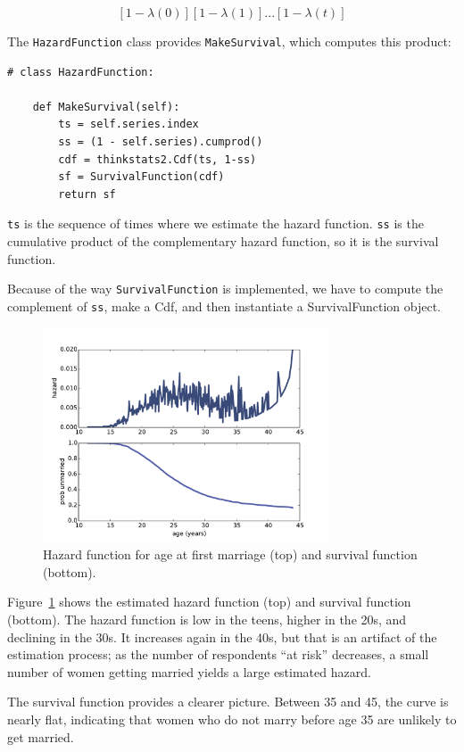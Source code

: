 \documentclass[12pt]{book}
\begin{document}
\[ [1-\lambda(0)] [1-\lambda(1)] ... [1-\lambda(t)] \]

The {\tt HazardFunction} class provides {\tt MakeSurvival}, which
computes this product:

\begin{verbatim}
# class HazardFunction:

    def MakeSurvival(self):
        ts = self.series.index
        ss = (1 - self.series).cumprod()
        cdf = thinkstats2.Cdf(ts, 1-ss)
        sf = SurvivalFunction(cdf)
        return sf
\end{verbatim}

{\tt ts} is the sequence of times where we estimate the hazard
function.  {\tt ss} is the cumulative product of the complementary
hazard function, so it is the survival function.

Because of the way {\tt SurvivalFunction} is implemented, we have
to compute the complement of {\tt ss}, make a Cdf, and then instantiate
a SurvivalFunction object.

\begin{figure}
\centerline{\includegraphics[height=2.5in]{figs/survival2.pdf}}
\caption{Hazard function for age at first marriage (top) and
survival function (bottom).}
\label{survival2}
\end{figure}

Figure~\ref{survival2} shows the estimated hazard function (top) and
survival function (bottom).  The hazard function is low in the teens,
higher in the 20s, and declining in the 30s.  It increases again in
the 40s, but that is an artifact of the estimation process; as the
number of respondents ``at risk'' decreases, a small number of
women getting married yields a large estimated hazard.

The survival function provides a clearer picture.  Between 35 and 45,
the curve is nearly flat, indicating that women who do not marry
before age 35 are unlikely to get married.
\end{document}
